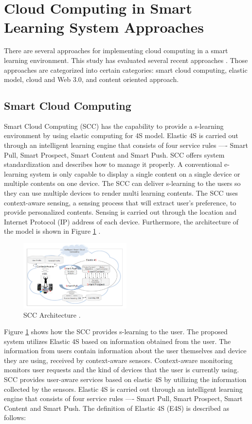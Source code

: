 \documentclass[journal]{vgtc}
\begin{document}
\section{Cloud Computing in Smart Learning System Approaches}
There are several approaches for implementing cloud computing in a smart learning environment. This study has evaluated several recent approaches \cite{Kim2013,s110807835,jeong2013content,jeong2013cloud,nasr2012proposed}. Those approaches are categorized into certain categories: smart cloud computing, elastic model, cloud and Web 3.0, and content oriented approach.

  \subsection{Smart Cloud Computing}
  Smart Cloud Computing (SCC) has the capability to provide a s-learning environment by using elastic computing for 4S model. Elastic 4S is carried out through an intelligent learning engine that consists of four service rules —- Smart Pull, Smart Prospect, Smart Content and Smart Push. SCC offers system standardization and describes how to manage it properly. A conventional e-learning system is only capable to display a single content on a single device or multiple contents on one device. The SCC can deliver s-learning to the users so they can use multiple devices to render multi learning contents. The SCC uses context-aware sensing, a sensing process that will extract user's preference, to provide personalized contents. Sensing is carried out through the location and Internet Protocol (IP) address of each device. Furthermore, the architecture of the model is shown in Figure \ref{scc} \cite{s110807835}.

  \begin{figure}[t]
    \centering
    \includegraphics[width=0.5\textwidth]{scc}
    \caption{SCC Architecture \cite{s110807835}.}
    \label{scc}
  \end{figure}

  Figure \ref{scc} shows how the SCC provides s-learning to the user. The proposed system utilizes Elastic 4S based on information obtained from the user. The information from users contain information about the user themselves and device they are using, received by context-aware sensors. Context-aware monitoring monitors user requests and the kind of devices that the user is currently using. SCC provides user-aware services based on elastic 4S by utilizing the information collected by the sensors. Elastic 4S is carried out through an intelligent learning engine that consists of four service rules —- Smart Pull, Smart Prospect, Smart Content and Smart Push. The definition of Elastic 4S (E4S) is described as follows:
\end{document}
